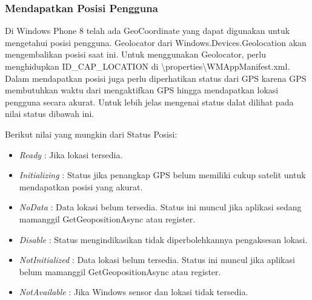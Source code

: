 \subsubsection{Mendapatkan Posisi Pengguna}
\label{subsubsec:Mendapatkan Posisi Pengguna}
\hspace{0.5cm} Di Windows Phone 8 telah ada GeoCoordinate yang dapat digunakan untuk mengetahui posisi pengguna. Geolocator dari Windows.Devices.Geolocation akan mengembalikan posisi saat ini. Untuk menggunakan Geolocator, perlu menghidupkan ID\_CAP\_LOCATION di \textbackslash properties\textbackslash WMAppManifest.xml. Dalam mendapatkan posisi juga perlu diperhatikan status dari GPS karena GPS membutuhkan waktu dari mengaktifkan GPS hingga mendapatkan lokasi pengguna secara akurat. Untuk lebih jelas mengenai status dalat dilihat pada nilai status dibawah ini.

Berikut nilai yang mungkin dari Status Posisi:
\begin{itemize}
	\item \textit{Ready} : Jika lokasi tersedia.
	\item \textit{Initializing} : Status jika penangkap GPS belum memiliki cukup satelit untuk mendapatkan posisi yang akurat. 
	\item \textit{NoData} : Data lokasi belum tersedia. Status ini muncul jika aplikasi sedang mamanggil GetGeopositionAsync atau register.
	\item \textit{Disable} : Status mengindikasikan tidak diperbolehkannya pengaksesan lokasi.
	\item \textit{NotInitialized} : Data lokasi belum tersedia. Status ini muncul jika aplikasi belum mamanggil GetGeopositionAsync atau register.
	\item \textit{NotAvailable} : Jika Windows sensor dan lokasi tidak tersedia.
\end{itemize}

